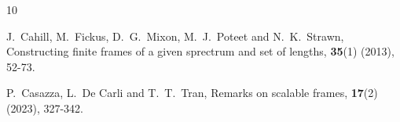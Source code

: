 \documentclass[sn-mathphys-num]{sn-jnl}%
\theoremstyle{definition}
\theoremstyle{remark}
\numberwithin{equation}{section}
\begin{document}
\begin{thebibliography}{10}












 
J.~Cahill, M.~Fickus, D.~G.~Mixon, M.~J.~Poteet and N.~K.~Strawn,
\newblock Constructing finite frames of a given sprectrum and set of lengths,
 \textbf{35}(1) (2013), 52-73.
 


P.~Casazza, L.~De Carli and T.~T.~Tran,
\newblock Remarks on scalable frames,
 \textbf{17}(2) (2023), 327-342.


\end{thebibliography}
\end{document}
